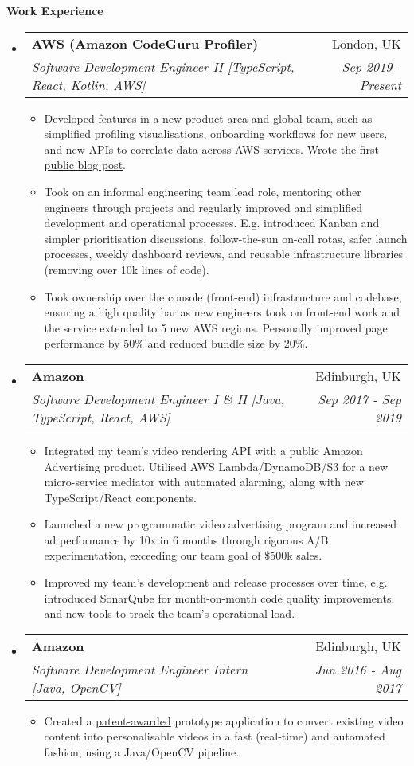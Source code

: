 \documentclass[letterpaper,11pt]{article}
\makeatletter
\newcommand{\resitem}[1]{\item #1 \vspace{-2pt}}
\newcommand{\resheading}[1]{{\large \colorbox{mygrey}{\begin{minipage}{\textwidth}{\textbf{#1 \vphantom{p\^{E}}}}\end{minipage}}}}
\newcommand{\ressubheading}[4]{
\begin{tabular*}{7.0in}{l@{\extracolsep{\fill}}r}
	\textbf{#1} & #2 \\
	\textit{#3} & \textit{#4} \\
\end{tabular*}\vspace{-6pt}}
\makeatother
\begin{document}
	\resheading{Work Experience}
	\begin{itemize}
		\item
		\ressubheading{AWS (Amazon CodeGuru Profiler)}{London, UK}{Software Development Engineer II [TypeScript, React, Kotlin, AWS]}{Sep 2019 - Present}
		\begin{itemize}
			\resitem{Developed features in a new product area and global team, such as simplified profiling visualisations, onboarding workflows for new users, and new APIs to correlate data across AWS services. Wrote the first \href{https://aws.amazon.com/blogs/machine-learning/optimizing-application-performance-with-amazon-codeguru-profiler/}{public blog post}.}
			\resitem{Took on an informal engineering team lead role, mentoring other engineers through projects and regularly improved and simplified development and operational processes. E.g. introduced Kanban and simpler prioritisation discussions, follow-the-sun on-call rotas, safer launch processes, weekly dashboard reviews, and reusable infrastructure libraries (removing over 10k lines of code).}
			\resitem{Took ownership over the console (front-end) infrastructure and codebase, ensuring a high quality bar as new engineers took on front-end work and the service extended to 5 new AWS regions. Personally improved page performance by 50\% and reduced bundle size by 20\%.}
		\end{itemize}

		\item
		\ressubheading{Amazon}{Edinburgh, UK}{Software Development Engineer I \& II [Java, TypeScript, React, AWS]}{Sep 2017 - Sep 2019}
		\begin{itemize}
			\resitem{Integrated my team's video rendering API with a public Amazon Advertising product. Utilised AWS Lambda/DynamoDB/S3 for a new micro-service mediator with automated alarming, along with new TypeScript/React components.}
			\resitem{Launched a new programmatic video advertising program and increased ad performance by 10x in 6 months through rigorous A/B experimentation, exceeding our team goal of \$500k sales.}
			\resitem{Improved my team's development and release processes over time, e.g. introduced SonarQube for month-on-month code quality improvements, and new tools to track the team's operational load.}
		\end{itemize}

		\item
		\ressubheading{Amazon}{Edinburgh, UK}{Software Development Engineer Intern [Java, OpenCV]}{Jun 2016 - Aug 2017}
		\begin{itemize}
			\resitem{Created a \href{https://pdfpiw.uspto.gov/.piw?PageNum=0&docid=10297026&IDKey=E3B5AD2132FF&HomeUrl=\%2F\%2Fpatft.uspto.gov\%2Fnetahtml\%2FPTO\%2Fpatimg.htm}{patent-awarded} prototype application to convert existing video content into personalisable videos in a fast (real-time)
			and automated fashion, using a Java/OpenCV pipeline.}
		\end{itemize}


\end{itemize}
\end{document}

